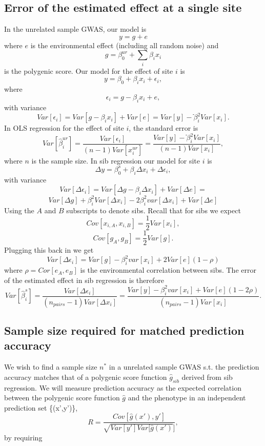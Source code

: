 \documentclass[hidelinks, 12pt]{article}
\begin{document}
\subsection{Error of the estimated effect at a single site}
In the unrelated sample GWAS, our model is
$$y=g+e$$
where $e$ is the environmental effect (including all random noise) and
$$g=\beta^{ur}_0+\sum_{i}\beta_ix_i$$ 
is the polygenic score.  Our model for the effect of site $i$ is 
\begin{equation}
\label{ols_model}
y=\beta_0+\beta_ix_i+\epsilon_i,
\end{equation}
where 
$$\epsilon_i=g-\beta_i x_i+e,$$
with variance
$$Var[\epsilon_i]=Var[g-\beta_i x_i]+Var[e] = Var[y]-ֿ\beta_i^2Var[x_i].$$
In OLS regression for the effect of site $i$, the standard error is
$$Var[\hat{\beta}^{ur}_i]=\frac{Var[\epsilon_i]}{(n-1) Var[x_i^{ur}]} = \frac{Var[y]-ֿ\beta_i^2Var[x_i]}{(n-1)Var[x_i]},$$
where $n$ is the sample size.  In sib regression our model for site $i$ is
$$\Delta y=\beta^{s}_0+\beta_i \Delta x_i+\Delta \epsilon_i,$$
with variance
$$Var[\Delta \epsilon_i] = Var[\Delta g-\beta_i \Delta x_i] + Var[\Delta e] =$$
$$Var[\Delta g]+\beta_i^2Var[\Delta x_i]-2\beta_i^2var[\Delta x_i]+ Var[\Delta e]$$
Using the $A$ and $B$ subscripts to denote sibs. Recall that for sibs we expect
$$Cov[x_{i,A},x_{i,B}]=\frac{1}{2}Var[x_i],$$
$$Cov[g_A,g_B]=\frac{1}{2}Var[g].$$
Plugging this back in we get
$$Var[\Delta \epsilon_i] = Var[g] - \beta_i^2var[x_i] + 2Var[e](1-\rho) $$
where $\rho = Cor[e_A,e_B]$ is the environmental correlation between sibs. The error of the estimated effect in sib regression is therefore
$$Var[\hat{\beta}^{s}_i]=\frac{Var[\Delta \epsilon_i]}{(n_{pairs}-1) Var[\Delta x_i]} = \frac{Var[y] - \beta_i^2var[x_i] + Var[e](1-2\rho)}{(n_{pairs}-1) Var[x_i]}.$$


\subsection{Sample size required for matched prediction accuracy}

We wish to find a sample size $n^*$ in a unrelated sample GWAS s.t. the prediction accuracy matches that of a polygenic score function $\hat{g}_{sib}$ derived from sib regression.  We will measure prediction accuracy as the expected correlation between the polygenic score function $\hat{g}$ and the phenotype in an independent prediction set \{(x',y')\},
$$R = \frac{Cov[\hat{g}(x'),y']}{\sqrt{Var[y']Var[\hat{g}(x')}]},$$
by requiring 
\end{document}
